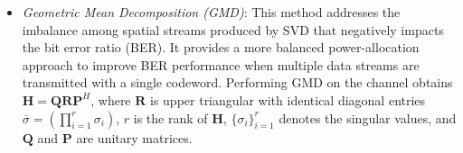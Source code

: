 \documentclass[lettersize,journal]{IEEEtran}
\begin{document}
\begin{appendices}
\begin{itemize}
A common way to select the regularization factor is $\xi=\frac{\sigma^2}{P_t}$, which is called the minimum mean square error (MMSE) beamforming and is listed separately in the table.
    \item \emph{Geometric Mean Decomposition (GMD)}: This method addresses the imbalance among spatial streams produced by SVD that negatively impacts the bit error ratio (BER). It provides a more balanced power-allocation approach to improve BER performance when multiple data streams are transmitted with a single codeword. Performing GMD on the channel obtains $\mathbf{H}=\mathbf{Q}\mathbf{R}\mathbf{P}^H$, where $\mathbf{R}$ is upper triangular with identical diagonal entries $\overline{\sigma}=\left(\prod_{i=1}^r\sigma_i\right)$, $r$ is the rank of $\mathbf{H}$, $\{\sigma_i\}_{i=1}^r$ denotes the singular values,
    and $\mathbf{Q}$ and $\mathbf{P}$ are unitary matrices.  
\end{itemize}



\end{appendices}
\end{document}

